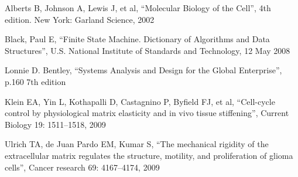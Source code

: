 \begin{thebibliography}{}                  %

 Alberts B, Johnson A, Lewis J, et al, 
``Molecular Biology of the Cell'', 
4th edition. New York: Garland Science, 2002

 Black, Paul E, 
``Finite State Machine. Dictionary of Algorithms and Data Structures'', 
U.S. National Institute of Standards and Technology, 12 May 2008

 Lonnie D. Bentley, 
``Systems Analysis and Design for the Global Enterprise'', 
 p.160 7th edition
 
 Klein EA, Yin L, Kothapalli D, Castagnino P, Byfield FJ, et al, 
``Cell-cycle control by physiological matrix elasticity and in vivo tissue stiffening'', 
Current Biology 19: 1511–1518, 2009

 Ulrich TA, de Juan Pardo EM, Kumar S, 
``The mechanical rigidity of the extracellular matrix regulates the structure, motility, and proliferation of glioma cells'', 
Cancer research 69: 4167–4174, 2009

\end{thebibliography}

